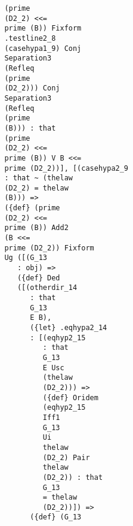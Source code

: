 \documentclass[12pt]{article}
\begin{document}
\begin{verbatim}
                                  (prime 
                                  (D2_2) <<= 
                                  prime (B)) Fixform 
                                  .testline2_8 
                                  (casehypa1_9) Conj 
                                  Separation3 
                                  (Refleq 
                                  (prime 
                                  (D2_2))) Conj 
                                  Separation3 
                                  (Refleq 
                                  (prime 
                                  (B))) : that 
                                  (prime 
                                  (D2_2) <<= 
                                  prime (B)) V B <<= 
                                  prime (D2_2))], [(casehypa2_9 
                                  : that ~ (thelaw 
                                  (D2_2) = thelaw 
                                  (B))) => 
                                  ({def} (prime 
                                  (D2_2) <<= 
                                  prime (B)) Add2 
                                  (B <<= 
                                  prime (D2_2)) Fixform 
                                  Ug ([(G_13 
                                     : obj) => 
                                     ({def} Ded 
                                     ([(otherdir_14 
                                        : that 
                                        G_13 
                                        E B), 
                                        ({let} .eqhypa2_14 
                                        : [(eqhyp2_15 
                                           : that 
                                           G_13 
                                           E Usc 
                                           (thelaw 
                                           (D2_2))) => 
                                           ({def} Oridem 
                                           (eqhyp2_15 
                                           Iff1 
                                           G_13 
                                           Ui 
                                           thelaw 
                                           (D2_2) Pair 
                                           thelaw 
                                           (D2_2)) : that 
                                           G_13 
                                           = thelaw 
                                           (D2_2))]) => 
                                        ({def} (G_13 

\end{verbatim}
\end{document}
